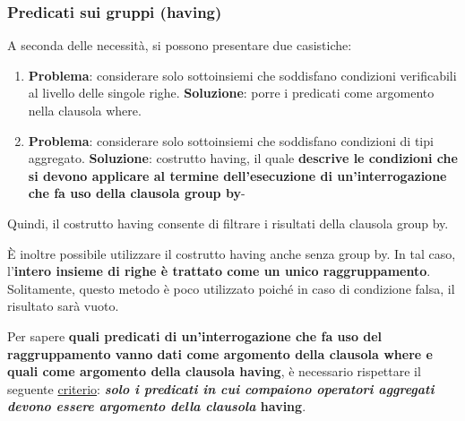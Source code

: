 \documentclass[a4paper]{article}
\begin{document}
	\subsubsection{Predicati sui gruppi (\textsf{having})}
	
	A seconda delle necessità, si possono presentare due casistiche:
	\begin{enumerate}
		\item \textbf{Problema}: considerare solo sottoinsiemi che soddisfano condizioni verificabili al livello delle singole righe.\newline
		\textbf{Soluzione}: porre i predicati come argomento nella clausola \textsf{where}.
		
		\item \textbf{Problema}: considerare solo sottoinsiemi che soddisfano condizioni di tipi aggregato.\newline
		\textbf{Soluzione}: costrutto \textsf{having}, il quale \textbf{descrive le condizioni che si devono applicare al termine dell'esecuzione di un'interrogazione che fa uso della clausola \textsf{group by}}-
	\end{enumerate}
	Quindi, il costrutto \textsf{having} consente di filtrare i risultati della clausola \textsf{group by}.\newline
	
	\noindent
	È inoltre possibile utilizzare il costrutto \textsf{having} anche senza \textsf{group by}. In tal caso, l'\textbf{intero insieme di righe è trattato come un unico raggruppamento}. Solitamente, questo metodo è poco utilizzato poiché in caso di condizione falsa, il risultato sarà vuoto.\newline
	
	\noindent
	Per sapere \textbf{quali predicati di un'interrogazione che fa uso del raggruppamento vanno dati come argomento della clausola \textsf{where} e quali come argomento della clausola \textsf{having}}, è necessario rispettare il seguente \underline{criterio}: \textbf{\emph{solo i predicati in cui compaiono operatori aggregati devono essere argomento della clausola} \textsf{having}}.\newline
	
\end{document}
